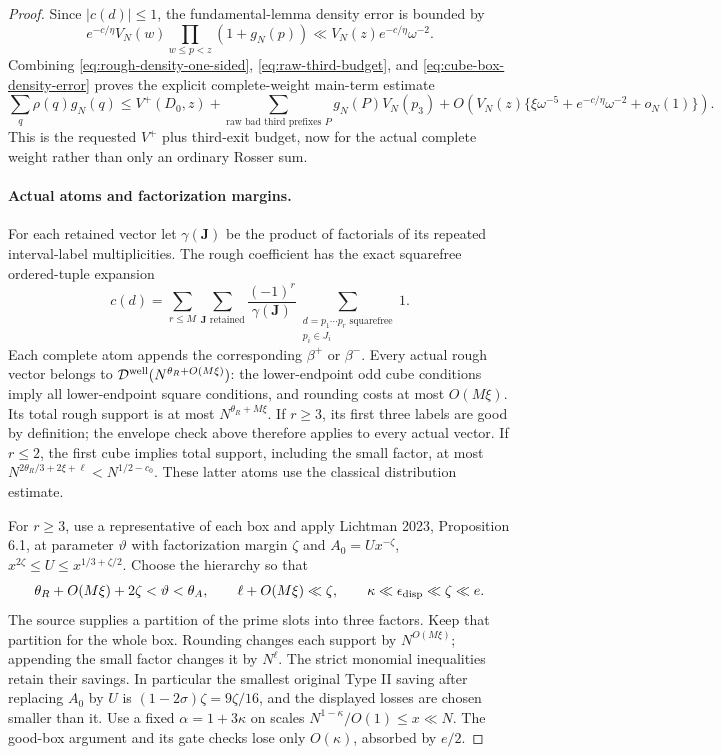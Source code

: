 \documentclass[11pt]{article}
\begin{document}
\begin{proof}
Since $|c(d)|\le1$, the fundamental-lemma density error is bounded by
\[
 e^{-c/\eta}V_N(w)\prod_{w\le p<z}(1+g_N(p))
 \ll V_N(z)e^{-c/\eta}\omega^{-2}.
\]
Combining \eqref{eq:rough-density-one-sided},
\eqref{eq:raw-third-budget}, and \eqref{eq:cube-box-density-error}
proves the explicit complete-weight main-term estimate
\begin{equation}\label{eq:complete-third-main}
 \sum_q\rho(q)g_N(q)
 \le V^+(D_0,z)+\sum_{\text{raw bad third prefixes }P}g_N(P)V_N(p_3)
 +O\!\left(V_N(z)\{\xi\omega^{-5}+e^{-c/\eta}\omega^{-2}+o_N(1)\}\right).
\end{equation}
This is the requested $V^+$ plus third-exit budget, now for the
actual complete weight rather than only an ordinary Rosser sum.

\paragraph{Actual atoms and factorization margins.}
For each retained vector let $\gamma(\boldsymbol J)$ be the product
of factorials of its repeated interval-label multiplicities.
The rough coefficient has the exact squarefree ordered-tuple expansion
\[
 c(d)=\sum_{r\le M}\sum_{\boldsymbol J\text{ retained}}
 \frac{(-1)^r}{\gamma(\boldsymbol J)}
 \sum_{\substack{d=p_1\cdots p_r\text{ squarefree}\\p_i\in J_i}}1.
\]
Each complete atom appends the corresponding $\beta^+$ or $\beta^-$.
Every actual rough vector belongs to
$\mathcal D^{\rm well}(N^{\theta_R+O(M\xi)})$:
the lower-endpoint odd cube conditions imply all lower-endpoint
square conditions, and rounding costs at most $O(M\xi)$.
Its total rough support is at most $N^{\theta_R+M\xi}$.
If $r\ge3$, its first three labels are good by definition;
the envelope check above therefore applies to every actual vector.
If $r\le2$, the first cube implies total support, including the
small factor, at most $N^{2\theta_R/3+2\xi+\ell}<N^{1/2-c_0}$.
These latter atoms use the classical distribution estimate.

For $r\ge3$, use a representative of each box and apply
Lichtman 2023, Proposition 6.1, at parameter $\vartheta$ with
factorization margin $\zeta$ and $A_0=Ux^{-\zeta}$,
$x^{2\zeta}\le U\le x^{1/3+\zeta/2}$.
Choose the hierarchy so that
\[
 \theta_R+O(M\xi)+2\zeta<\vartheta<\theta_A,
 \qquad \ell+O(M\xi)\ll\zeta,
 \qquad \kappa\ll\epsilon_{\rm disp}\ll\zeta\ll e.
\]
The source supplies a partition of the prime slots into three factors.
Keep that partition for the whole box. Rounding changes each support
by $N^{O(M\xi)}$; appending the small factor changes it by $N^\ell$.
The strict monomial inequalities retain their savings. In particular
the smallest original Type II saving after replacing $A_0$ by $U$
is $(1-2\sigma)\zeta=9\zeta/16$, and the displayed losses are
chosen smaller than it.
Use a fixed $\alpha=1+3\kappa$ on scales
$N^{1-\kappa}/O(1)\le x\ll N$. The good-box argument and its gate
checks lose only $O(\kappa)$, absorbed by $e/2$.


\end{proof}
\end{document}
